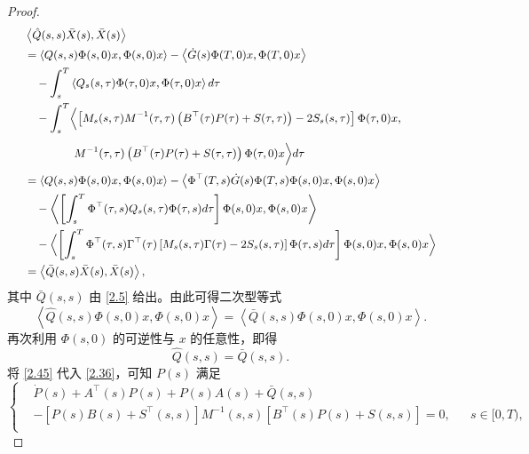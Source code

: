 \documentclass{GZUbachelorthesis}
\begin{document}
\begin{proof}
	\begin{equation}\label{2.21}
		{\small
			\begin{aligned}
				&\left\langle\hat{Q}(s,s)\bar{X}(s),\bar{X}(s)\right\rangle \\
				&= \left\langle Q(s,s)\Phi(s,0)x,\Phi(s,0)x\right\rangle - \left\langle \dot{G}(s)\Phi(T,0)x,\Phi(T,0)x \right\rangle \\
				&\quad - \int_{s}^{T}\left\langle Q_s(s,\tau)\Phi(\tau,0)x,\Phi(\tau,0)x \right\rangle d\tau \\
				&\quad - \int_{s}^{T} \Bigl\langle \left[M_s(s,\tau)M^{-1}(\tau,\tau)\left(B^\top(\tau)P(\tau)+S(\tau,\tau)\right)-2S_s(s,\tau)\right]\Phi(\tau,0)x, \\
				&\phantom{\quad - \int_{s}^{T} \Bigl\langle} M^{-1}(\tau,\tau)\left(B^\top(\tau)P(\tau)+S(\tau,\tau)\right)\Phi(\tau,0)x \Bigr\rangle d\tau \\
				&= \left\langle Q(s,s)\Phi(s,0)x,\Phi(s,0)x\right\rangle - \left\langle \Phi^\top(T,s)\dot{G}(s)\Phi(T,s)\Phi(s,0)x,\Phi(s,0)x \right\rangle \\
				&\quad - \left\langle\left[\int_{s}^{T} \Phi^\top(\tau,s)Q_s(s,\tau)\Phi(\tau,s)d\tau\right]\Phi(s,0)x,\Phi(s,0)x \right\rangle \\
				&\quad - \Bigl\langle\left[\int_{s}^{T}\Phi^\top(\tau,s)\Gamma^\top(\tau)\left[M_s(s,\tau)\Gamma(\tau)-2S_s(s,\tau)\right]\Phi(\tau,s)d\tau\right]\Phi(s,0)x,\Phi(s,0)x\Bigr\rangle \\
				&= \left\langle\bar{Q}(s,s)\bar{X}(s),\bar{X}(s)\right\rangle,
			\end{aligned}
		}
	\end{equation}
	其中 ${\bar{Q}(s,s)}$ 由 \eqref{2.5} 给出。由此可得二次型等式
	\begin{equation}\label{2.34}
		\left\langle\hat{Q}(s,s)\Phi(s,0)x,\Phi(s,0)x\right\rangle=\left\langle\bar{Q}(s,s)\Phi(s,0)x,\Phi(s,0)x\right\rangle.
	\end{equation}
	再次利用 $\Phi(s,0)$ 的可逆性与 $x$ 的任意性，即得
	\begin{equation}\label{2.45}
		\hat{Q}(s,s)=\bar{Q}(s,s).
	\end{equation}
	将 \eqref{2.45} 代入 \eqref{2.36}，可知 $P(s)$ 满足
	\begin{equation}\label{2.23}
		{
			{
				\left\{
				\begin{aligned}
					&\dot{P}(s)+A^\top(s)P(s)+P(s)A(s)+\bar{Q}(s,s)\\
					&-\left[P(s)B(s)+S^\top(s,s)\right]M^{-1}(s,s)[B^\top(s)P(s)+S(s,s)] = 0, && s\in[0,T),\\[8pt]

\end{aligned}}}
\end{equation}
\end{proof}
\end{document}
